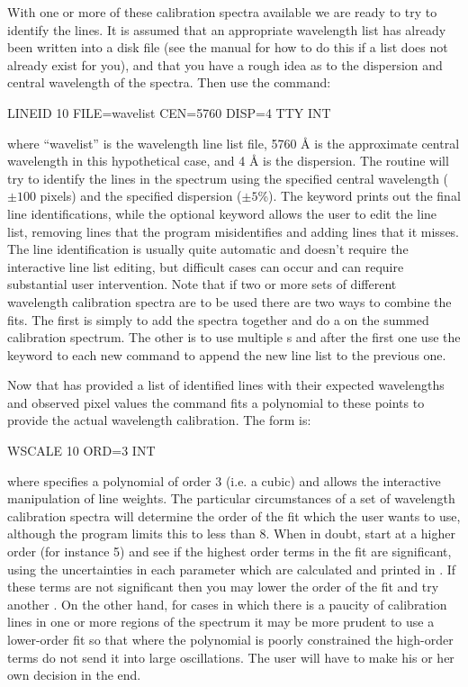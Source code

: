 With one or more of these calibration spectra available we are ready to try to
identify the lines.  It is assumed that an appropriate wavelength list has
already been written into a disk file (see the manual for how to do this if a
list does not already exist for you), and that you have a rough idea as to the
dispersion and central wavelength of the spectra.  Then use the 
command:
\begin{command}
   \item LINEID 10 FILE=wavelist CEN=5760 DISP=4 TTY INT
\end{command}
\noindent
where ``wavelist'' is the wavelength line list file, 5760 {\AA} is the
approximate central wavelength in this hypothetical case, and 4 {\AA} is the
dispersion.  The routine will try to identify the lines in the spectrum using
the specified central wavelength ($\pm 100$ pixels) and the specified
dispersion ($\pm 5$\%).  The  keyword prints out the final line
identifications, while the optional  keyword allows the user to edit
the line list, removing lines that the program misidentifies and adding lines
that it misses.  The line identification is usually quite automatic and
doesn't require the interactive line list editing, but difficult cases can
occur and can require substantial user intervention.  Note that if two or more
sets of different wavelength calibration spectra are to be used there are two
ways to combine the fits.  The first is simply to add the spectra together and
do a  on the summed calibration spectrum.  The other is to use
multiple s and after the first one use the  keyword to
each new  command to append the new line list to the previous
one.

Now that  has provided a list of identified lines with their
expected wavelengths and observed pixel values the  command fits
a polynomial to these points to provide the actual wavelength calibration. The
form is:
\begin{command}
   \item WSCALE 10 ORD=3 INT
\end{command}
\noindent
where  specifies a polynomial of order 3 (i.e. a cubic) and
 allows the interactive manipulation of line weights.  The
particular circumstances of a set of wavelength calibration spectra will
determine the order of the fit which the user wants to use, although the
program limits this to less than 8. When in doubt, start at a higher order
(for instance 5) and see if the highest order terms in the fit are
significant, using the uncertainties in each parameter which are calculated
and printed in . If these terms are not significant then you may
lower the order of the fit and try another .  On the other hand,
for cases in which there is a paucity of calibration lines in one or more
regions of the spectrum it may be more prudent to use a lower-order fit so
that where the polynomial is poorly constrained the high-order terms do not
send it into large oscillations.  The user will have to make his or her own
decision in the end.

